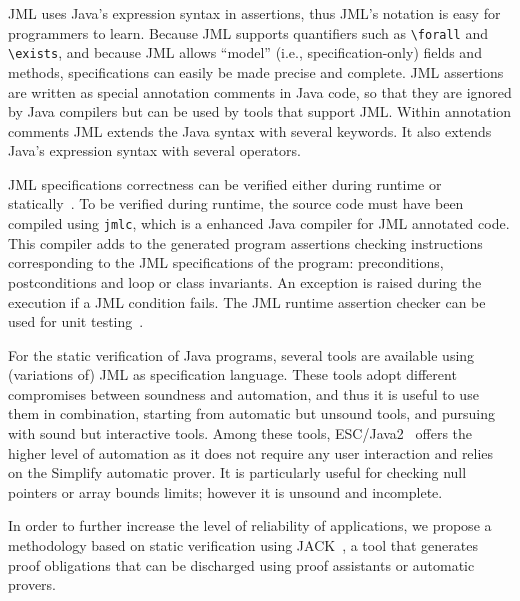 JML uses Java's expression syntax in assertions,
thus JML's notation is easy for programmers to learn.  
Because JML supports quantifiers such as
\verb_\forall_ and \verb_\exists_, and because JML allows ``model''
(i.e., specification-only) fields and methods, specifications can
easily be made precise and complete.
JML assertions are written as special
annotation comments in Java code,
so that they are ignored by Java compilers but can be used
by tools that support JML\@.  Within annotation comments JML extends the
Java syntax with several keywords.  It also extends Java's expression syntax with several
operators.

JML specifications correctness can be verified either during runtime
or statically~\cite{BurdyCCEKLLP03}. To be verified during runtime, the
source code must have been compiled using \texttt{jmlc}, which is a
enhanced Java compiler for JML annotated code. This compiler adds to
the generated program assertions checking instructions corresponding
to the JML specifications of the program: preconditions, postconditions 
and loop or class invariants. An exception is raised during the execution 
if a JML condition fails. The JML runtime assertion checker can be used
for unit testing~\cite{CL02:ecoop}.


For the static verification of Java programs, several tools are
available using (variations of) JML as specification language. These
tools adopt different compromises between soundness and automation,
and thus it is useful to use them in combination, starting from
automatic but unsound tools, and pursuing with sound but interactive
tools.  Among these tools, ESC/Java2~\cite{CK04:cassis} offers the higher
level of automation as it does not require any user interaction and
relies on the Simplify automatic prover. It is particularly useful for
checking null pointers or array bounds limits; however it is unsound
and incomplete.

In order to further increase the level of reliability of applications,
we propose a methodology based on static verification using
JACK~\cite{BRL-JACK}, a tool that generates proof obligations that
can be discharged using proof assistants or automatic provers.


